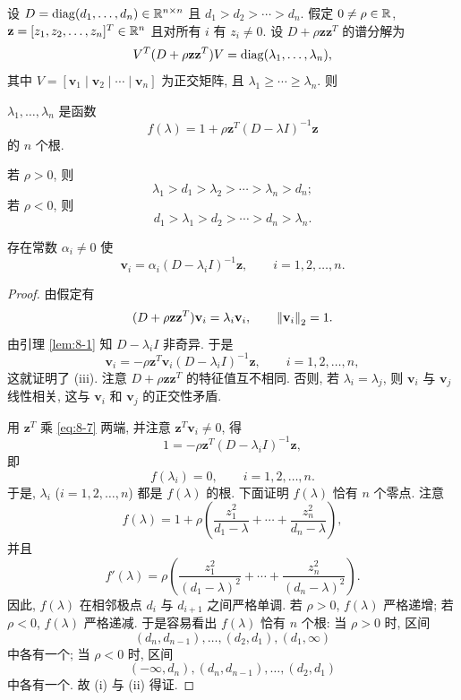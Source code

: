 \begin{theorem}
\label{thm:8-8}
设 $D=\operatorname{diag}(d_1,\ldots,d_n)\in\mathbb{R}^{n\times n}$ 且 $d_1>d_2>\cdots>d_n$. 假定 $0\neq\rho\in\mathbb{R}$, $\mathbf{z}=[z_1,z_2,\ldots,z_n]^T\in\mathbb{R}^n$ 且对所有 $i$ 有 $z_i\neq0$. 设 $D+\rho\mathbf{z}\mathbf{z}^T$ 的谱分解为
\[
  V^T(D+\rho\mathbf{z}\mathbf{z}^T)V=\operatorname{diag}(\lambda_1,\ldots,\lambda_n),
\]
其中 $V=[\mathbf{v}_1\mid\mathbf{v}_2\mid\cdots\mid\mathbf{v}_n]$ 为正交矩阵, 且 $\lambda_1\geqslant\cdots\geqslant\lambda_n$. 则
\begin{romanlist}
  \item $\lambda_1,\ldots,\lambda_n$ 是函数
    \[
      f(\lambda)=1+\rho\mathbf{z}^T(D-\lambda I)^{-1}\mathbf{z}
    \]
    的 $n$ 个根.
  \item 若 $\rho>0$, 则
    \[
      \lambda_1>d_1>\lambda_2>\cdots>\lambda_n>d_n;
    \]
    若 $\rho<0$, 则
    \[
      d_1>\lambda_1>d_2>\cdots>d_n>\lambda_n.
    \]
  \item 存在常数 $\alpha_i\neq0$ 使
    \[
      \mathbf{v}_i=\alpha_i(D-\lambda_iI)^{-1}\mathbf{z},
      \qquad i=1,2,\ldots,n.
    \]
\end{romanlist}
\end{theorem}

\begin{proof}
由假定有
\[
  (D+\rho\mathbf{z}\mathbf{z}^T)\mathbf{v}_i=\lambda_i\mathbf{v}_i,
  \qquad \left\|\mathbf{v}_i\right\|_2=1.
\]
由引理 \ref{lem:8-1} 知 $D-\lambda_iI$ 非奇异. 于是
\begin{equation}
  \mathbf{v}_i=-\rho\mathbf{z}^T\mathbf{v}_i(D-\lambda_iI)^{-1}\mathbf{z},
  \qquad i=1,2,\ldots,n,
  \label{eq:8-7}
\end{equation}
这就证明了 (iii). 注意 $D+\rho\mathbf{z}\mathbf{z}^T$ 的特征值互不相同. 否则, 若 $\lambda_i=\lambda_j$, 则 $\mathbf{v}_i$ 与 $\mathbf{v}_j$ 线性相关, 这与 $\mathbf{v}_i$ 和 $\mathbf{v}_j$ 的正交性矛盾.

用 $\mathbf{z}^T$ 乘 \eqref{eq:8-7} 两端, 并注意 $\mathbf{z}^T\mathbf{v}_i\neq0$, 得
\[
  1=-\rho\mathbf{z}^T(D-\lambda_iI)^{-1}\mathbf{z},
\]
即
\[
  f(\lambda_i)=0,
  \qquad i=1,2,\ldots,n.
\]
于是, $\lambda_i$ ($i=1,2,\ldots,n$) 都是 $f(\lambda)$ 的根. 下面证明 $f(\lambda)$ 恰有 $n$ 个零点. 注意
\[
  f(\lambda)=1+\rho\left(\frac{z_1^2}{d_1-\lambda}+\cdots+\frac{z_n^2}{d_n-\lambda}\right),
\]
并且
\[
  f'(\lambda)=\rho\left(\frac{z_1^2}{(d_1-\lambda)^2}+\cdots+\frac{z_n^2}{(d_n-\lambda)^2}\right).
\]
因此, $f(\lambda)$ 在相邻极点 $d_i$ 与 $d_{i+1}$ 之间严格单调. 若 $\rho>0$, $f(\lambda)$ 严格递增; 若 $\rho<0$, $f(\lambda)$ 严格递减. 于是容易看出 $f(\lambda)$ 恰有 $n$ 个根: 当 $\rho>0$ 时, 区间
\[
  (d_n,d_{n-1}),\ldots,(d_2,d_1),(d_1,\infty)
\]
中各有一个; 当 $\rho<0$ 时, 区间
\[
  (-\infty,d_n),(d_n,d_{n-1}),\ldots,(d_2,d_1)
\]
中各有一个. 故 (i) 与 (ii) 得证.
\end{proof}

